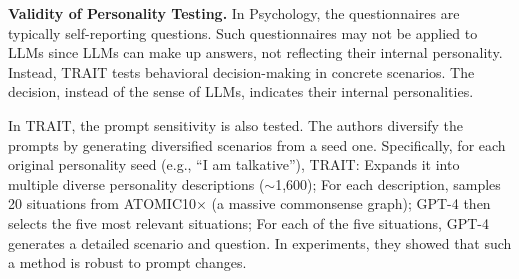 \textbf{Validity of Personality Testing.}
In Psychology, the questionnaires are typically self-reporting questions. Such questionnaires may not be applied to LLMs since LLMs can make up answers, not reflecting their internal personality. Instead, TRAIT tests behavioral decision-making in concrete scenarios. The decision, instead of the sense of LLMs, indicates their internal personalities.

In TRAIT, the prompt sensitivity is also tested. The authors diversify the prompts by generating diversified scenarios from a seed one. Specifically, for each original personality seed (e.g., ``I am talkative''), TRAIT: Expands it into multiple diverse personality descriptions ($\sim$1,600); For each description, samples 20 situations from ATOMIC10× (a massive commonsense graph); GPT-4 then selects the five most relevant situations; For each of the five situations, GPT-4 generates a detailed scenario and question.
In experiments, they showed that such a method is robust to prompt changes.

